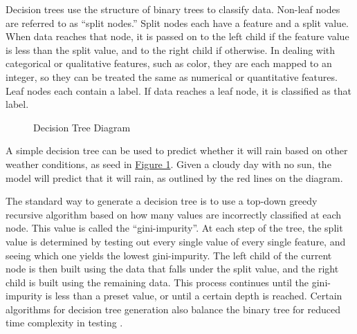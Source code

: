 \documentclass[12pt]{article}
\begin{document}
Decision trees use the structure of binary trees to classify data. Non-leaf nodes are referred to as ``split nodes.'' Split nodes each have a feature and a split value. When data reaches that node, it is passed on to the left child if the feature value is less than the split value, and to the right child if otherwise. In dealing with categorical or qualitative features, such as color, they are each mapped to an integer, so they can be treated the same as numerical or quantitative features. Leaf nodes each contain a label. If data reaches a leaf node, it is classified as that label.

\begin{figure}[H]
    \centering
    \caption{Decision Tree Diagram}
    \label{fig:decisiontree}
\end{figure}

A simple decision tree can be used to predict whether it will rain based on other weather conditions, as seed in \hyperref[fig:decisiontree]{Figure 1}. Given a cloudy day with no sun, the model will predict that it will rain, as outlined by the red lines on the diagram.

The standard way to generate a decision tree is to use a top-down greedy recursive algorithm based on how many values are incorrectly classified at each node. This value is called the ``gini-impurity''. At each step of the tree, the split value is determined by testing out every single value of every single feature, and seeing which one yields the lowest gini-impurity. The left child of the current node is then built using the data that falls under the split value, and the right child is built using the remaining data. This process continues until the gini-impurity is less than a preset value, or until a certain depth is reached. Certain algorithms for decision tree generation also balance the binary tree for reduced time complexity in testing \autocite{scikit-learn}.
\end{document}
